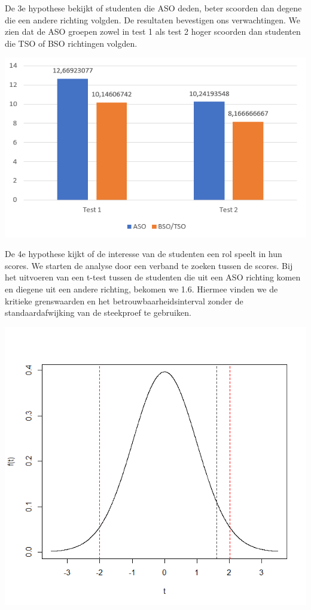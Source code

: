 \documentclass{hogent-article}
\begin{document}
	
	De 3e hypothese bekijkt of studenten die ASO deden, beter scoorden dan degene die een andere richting volgden. De resultaten bevestigen ons verwachtingen. We zien dat de ASO groepen zowel in test 1 als test 2 hoger scoorden dan studenten die TSO of BSO richtingen volgden.
	
	\begin{minipage}[b]{2.8in}
		\centering
		\includegraphics[width=\linewidth]{img/aso.png}
	\end{minipage}
	
	De 4e hypothese kijkt of de interesse van de studenten een rol speelt in hun scores.
	We starten de analyse door een verband te zoeken tussen de scores. Bij het uitvoeren van een t-test tussen de studenten die uit een ASO richting komen en diegene uit een andere richting, bekomen we 1.6. Hiermee vinden we de kritieke grenswaarden en het betrouwbaarheidsinterval zonder de standaardafwijking van de steekproef te gebruiken.
	
	\begin{minipage}[b]{2.8in}
		\centering
		\includegraphics[width=\linewidth]{img/ttest.png}
	\end{minipage}
	
\end{document}
